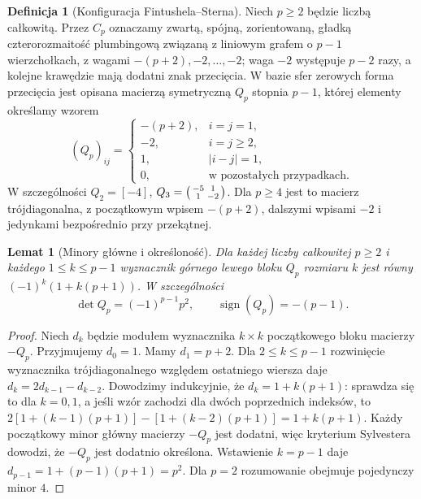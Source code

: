 \documentclass[11pt,a4paper]{report}
\numberwithin{equation}{section}
\theoremstyle{plain}
\newtheorem{lemat}[twierdzenie]{Lemat}
\theoremstyle{definition}
\newtheorem{definicja}[twierdzenie]{Definicja}
\theoremstyle{remark}
\begin{document}
\begin{definicja}[Konfiguracja Fintushela--Sterna]
Niech $p\geq2$ będzie liczbą całkowitą.
Przez $C_p$ oznaczamy zwartą, spójną, zorientowaną,
gładką czterorozmaitość plumbingową związaną z liniowym
grafem o $p-1$ wierzchołkach, z wagami
$-(p+2),-2,\ldots,-2$; waga $-2$ występuje
$p-2$ razy, a kolejne krawędzie mają dodatni znak
przecięcia. W bazie sfer zerowych forma przecięcia jest opisana
macierzą symetryczną $Q_p$ stopnia $p-1$, której elementy
określamy wzorem
\[
(Q_p)_{ij}=\begin{cases}
-(p+2),&i=j=1,\\
-2,&i=j\geq2,\\
1,&|i-j|=1,\\
0,&\text{w pozostałych przypadkach}.
\end{cases}
\]
W szczególności $Q_2=[-4]$,
$Q_3=\begin{psmallmatrix}-5&1\\1&-2\end{psmallmatrix}$.
Dla $p\geq4$ jest to macierz trójdiagonalna,
z początkowym wpisem $-(p+2)$, dalszymi wpisami
$-2$ i jedynkami bezpośrednio przy przekątnej.
\end{definicja}

\begin{center}
\end{center}

\begin{lemat}[Minory główne i określoność]
\label{lem:tg-rb-minors}
Dla każdej liczby całkowitej $p\geq2$ i każdego
$1\leq k\leq p-1$ wyznacznik górnego lewego bloku
$Q_p$ rozmiaru $k$ jest równy
$(-1)^k(1+k(p+1))$. W szczególności
\[
\det Q_p=(-1)^{p-1}p^2,
\qquad \operatorname{sign}(Q_p)=-(p-1).
\]
\end{lemat}

\begin{proof}
Niech $d_k$ będzie modułem wyznacznika $k\times k$
początkowego bloku macierzy $-Q_p$.
Przyjmujemy $d_0=1$. Mamy $d_1=p+2$.
Dla $2\leq k\leq p-1$ rozwinięcie wyznacznika
trójdiagonalnego względem ostatniego wiersza daje
$d_k=2d_{k-1}-d_{k-2}$. Dowodzimy indukcyjnie,
że $d_k=1+k(p+1)$: sprawdza się to dla $k=0,1$,
a jeśli wzór zachodzi dla dwóch poprzednich indeksów,
to $2[1+(k-1)(p+1)]-[1+(k-2)(p+1)]
=1+k(p+1)$.
Każdy początkowy minor główny macierzy $-Q_p$
jest dodatni, więc kryterium Sylvestera dowodzi,
że $-Q_p$ jest dodatnio określona. Wstawienie
$k=p-1$ daje $d_{p-1}=1+(p-1)(p+1)=p^2$.
Dla $p=2$ rozumowanie obejmuje pojedynczy minor $4$.
\end{proof}
\end{document}
